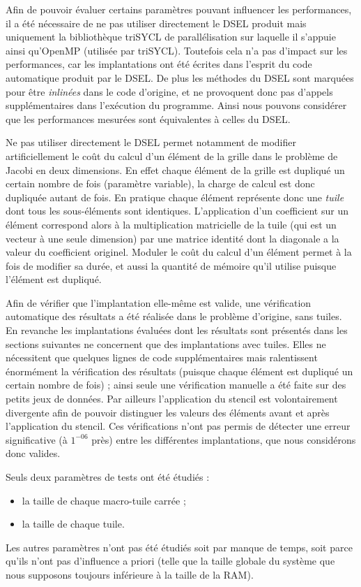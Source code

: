 Afin de pouvoir évaluer certains paramètres pouvant influencer les performances, il a été nécessaire de ne pas utiliser directement le DSEL produit mais uniquement la bibliothèque \textsf{triSYCL} de parallélisation sur laquelle il s'appuie ainsi qu'\textsf{OpenMP} (utilisée par \textsf{triSYCL}). Toutefois cela n'a pas d'impact sur les performances, car les implantations ont été écrites dans l'esprit du code automatique produit par le DSEL. De plus les méthodes du DSEL sont marquées pour être \emph{inlinées} dans le code d'origine, et ne provoquent donc pas d'appels supplémentaires dans l'exécution du programme. Ainsi nous pouvons considérer que les performances mesurées sont équivalentes à celles du DSEL.

Ne pas utiliser directement le DSEL permet notamment de modifier artificiellement le coût du calcul d'un élément de la grille dans le problème de Jacobi en deux dimensions. En effet chaque élément de la grille est dupliqué un certain nombre de fois (paramètre variable), la charge de calcul est donc dupliquée autant de fois. En pratique chaque élément représente donc une \emph{tuile} dont tous les sous-éléments sont identiques. L'application d'un coefficient sur un élément correspond alors à la multiplication matricielle de la tuile (qui est un vecteur à une seule dimension) par une matrice identité dont la diagonale a la valeur du coefficient originel. Moduler le coût du calcul d'un élément permet à la fois de modifier sa durée, et aussi la quantité de mémoire qu'il utilise puisque l'élément est dupliqué.

Afin de vérifier que l'implantation elle-même est valide, une vérification automatique des résultats a été réalisée dans le problème d'origine, sans tuiles. En revanche les implantations évaluées dont les résultats sont présentés dans les sections suivantes ne concernent que des implantations avec tuiles. Elles ne nécessitent que quelques lignes de code supplémentaires mais ralentissent énormément la vérification des résultats (puisque chaque élément est dupliqué un certain nombre de fois) ; ainsi seule une vérification manuelle a été faite sur des petits jeux de données. Par ailleurs l'application du stencil est volontairement divergente afin de pouvoir distinguer les valeurs des éléments avant et après l'application du stencil. Ces vérifications n'ont pas permis de détecter une erreur significative (à $1^{-06}$ près) entre les différentes implantations, que nous considérons donc valides. 

Seuls deux paramètres de tests ont été étudiés :
\begin{itemize}
\item la taille de chaque macro-tuile carrée ;
\item la taille de chaque tuile.
\end{itemize}
Les autres paramètres n'ont pas été étudiés soit par manque de temps, soit parce qu'ils n'ont pas d'influence a priori (telle que la taille globale du système que nous supposons toujours inférieure à la taille de la RAM).

